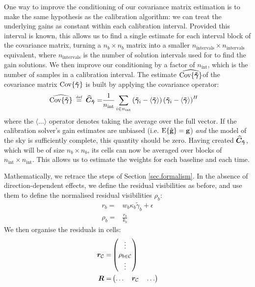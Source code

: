 \pg
One way to improve the conditioning of our covariance matrix estimation is to make the same hypothesis as the calibration algorithm: we can treat the underlying gains as constant within each calibration interval. Provided this interval is known, this allows us to find a single estimate for each interval block of the covariance matrix, turning a $n_b\times n_b$ matrix into a smaller $n_{\mathrm{intervals}}\times n_{\mathrm{intervals}}$ equivalent, where $n_{\mathrm{intervals}}$ is the number of solution intervals used for to find the gain solutions. We then improve our conditioning by a factor of $n_\mathrm{int}$, which is the number of samples in a calibration interval. The estimate $\widehat{\textrm{Cov}\{\bm{\tilde{\gamma}}\}}$of the covariance matrix $\textrm{Cov}\{\bm{\tilde{\gamma}}\}$ is built by applying the covariance operator:
\begin{align}
\widehat{\Cov{\matGains}} \bydefn \estC =&  \frac{1}{n_\mathrm{int}}\sum_{i\in n_{\mathrm{int}}}\left(\matGains_i- \langle \matGains \rangle\right) \left(\matGains_i - \langle \matGains \rangle \right)^H
\end{align}
where the $\langle \hdots\rangle$ operator denotes taking the average over the full vector. If the calibration solver's gain estimates are unbiased (i.e. $\textrm{E}\{\hat{\textbf{g}}\}=\textbf{g}$) \emph{and} the model of the sky is sufficiently complete, this quantity should be zero. Having created $\widehat{\bm{C}}_{\bm{\tilde{\gamma}}}$, which will be of size $n_b \times n_b$, its cells can now be averaged over blocks of $n_\mathrm{int}\times n_\mathrm{int}$. This allows us to estimate the weights for each baseline and each time.

\pg
Mathematically, we retrace the steps of Section \ref{sec.formalism}. In the absence of direction-dependent effects, we define the residual visibilities as before, and use them to define the normalised residual visibilities $\rho_b$:
\begin{align}
r_{b} =& w_b \kappa_b \tilde{\gamma}_b  + \epsilon \label{eq.residual.matrix}\\
\rho_{b} =& \frac{r_{b}}{k_b}
\end{align}
We then organise the residuals in cells:
\begin{align}
\Rmat{\cellindex} =&   \begin{pmatrix} \vdots \\ \rho_{b\in \cellindex} \\ \vdots \end{pmatrix}\\ %
\bm{R} =&   \begin{pmatrix} \hdots \quad \Rmat{\cellindex} \quad \hdots \end{pmatrix}
\end{align}

